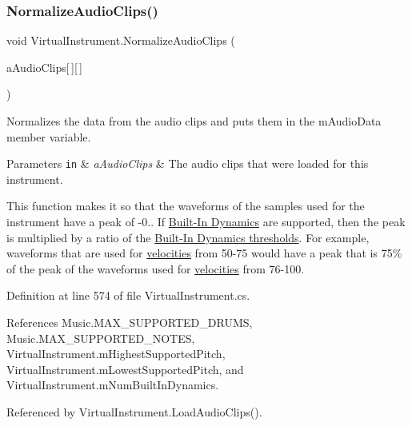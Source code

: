 \subsubsection{\texorpdfstring{Normalize\+Audio\+Clips()}{NormalizeAudioClips()}}
{\footnotesize\ttfamily void Virtual\+Instrument.\+Normalize\+Audio\+Clips (\begin{DoxyParamCaption}\item[{Audio\+Clip}]{a\+Audio\+Clips\mbox{[}$\,$\mbox{]}\mbox{[}$\,$\mbox{]} }\end{DoxyParamCaption})\hspace{0.3cm}{\ttfamily [private]}}



Normalizes the data from the audio clips and puts them in the m\+Audio\+Data member variable. 


\begin{DoxyParams}[1]{Parameters}
\mbox{\tt in}  & {\em a\+Audio\+Clips} & The audio clips that were loaded for this instrument.\\
\hline
\end{DoxyParams}
This function makes it so that the waveforms of the samples used for the instrument have a peak of -\/0.. If \hyperlink{group___audio_DefBID}{Built-\/\+In Dynamics} are supported, then the peak is multiplied by a ratio of the \hyperlink{group___audio_DefBIDThresh}{Built-\/\+In Dynamics thresholds}. For example, waveforms that are used for \hyperlink{group___audio_DefVel}{velocities} from 50-\/75 would have a peak that is 75\% of the peak of the waveforms used for \hyperlink{group___audio_DefVel}{velocities} from 76-\/100. 

Definition at line 574 of file Virtual\+Instrument.\+cs.



References Music.\+M\+A\+X\+\_\+\+S\+U\+P\+P\+O\+R\+T\+E\+D\+\_\+\+D\+R\+U\+MS, Music.\+M\+A\+X\+\_\+\+S\+U\+P\+P\+O\+R\+T\+E\+D\+\_\+\+N\+O\+T\+ES, Virtual\+Instrument.\+m\+Highest\+Supported\+Pitch, Virtual\+Instrument.\+m\+Lowest\+Supported\+Pitch, and Virtual\+Instrument.\+m\+Num\+Built\+In\+Dynamics.



Referenced by Virtual\+Instrument.\+Load\+Audio\+Clips().


